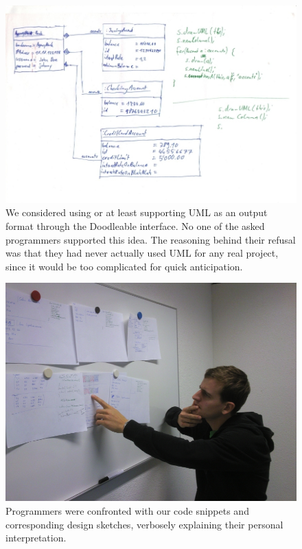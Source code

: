\documentclass[english]{acm_proc_article-sp}
\begin{document}
\begin{figure}[h]
	\includegraphics[width=\linewidth]{img/sketches/006.jpg}
	\caption[Bad sketch example: UML]{We considered using or at least supporting UML as an output format through the Doodleable interface. No one of the asked programmers supported this idea. The reasoning behind their refusal was that they had never actually used UML for any real project, since it would be too complicated for quick anticipation.}
	\label{bad-sketch_uml}
\end{figure}

\begin{figure}[h]
	\includegraphics[width=\linewidth]{img/design-sketches_thinker.jpg}
	\caption[Confronting people with design sketches]{Programmers were confronted with our code snippets and corresponding design sketches, verbosely explaining their personal interpretation.}
	\label{sketch-discussion}
\end{figure}
\end{document}
